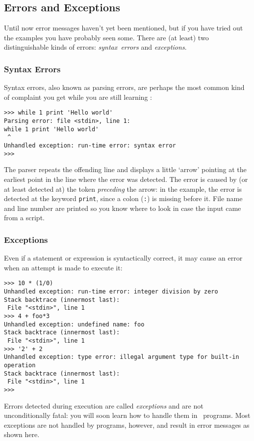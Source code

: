 \subsection{Errors and Exceptions}

Until now error messages haven't yet been mentioned, but if you have
tried out the examples you have probably seen some.
There are (at least) two distinguishable kinds of errors:
{\em syntax\ errors}
and
{\em exceptions}.

\subsubsection{Syntax Errors}

Syntax errors, also known as parsing errors, are perhaps the most common
kind of complaint you get while you are still learning \Python:
\bcode\begin{verbatim}
>>> while 1 print 'Hello world'
Parsing error: file <stdin>, line 1:
while 1 print 'Hello world'
 ^
Unhandled exception: run-time error: syntax error
>>>
\end{verbatim}\ecode
The parser repeats the offending line and displays a little `arrow'
pointing at the earliest point in the line where the error was detected.
The error is caused by (or at least detected at) the token
{\em preceding}
the arrow: in the example, the error is detected at the keyword
{\tt print}, since a colon ({\tt :}) is missing before it.
File name and line number are printed so you know where to look in case
the input came from a script.

\subsubsection{Exceptions}

Even if a statement or expression is syntactically correct, it may cause
an error when an attempt is made to execute it:
\bcode\small\begin{verbatim}
>>> 10 * (1/0)
Unhandled exception: run-time error: integer division by zero
Stack backtrace (innermost last):
 File "<stdin>", line 1
>>> 4 + foo*3
Unhandled exception: undefined name: foo
Stack backtrace (innermost last):
 File "<stdin>", line 1
>>> '2' + 2
Unhandled exception: type error: illegal argument type for built-in operation
Stack backtrace (innermost last):
 File "<stdin>", line 1
>>>
\end{verbatim}\ecode
Errors detected during execution are called
{\em exceptions}
and are not unconditionally fatal: you will soon learn how to handle
them in \Python\ programs.
Most exceptions are not handled by programs, however, and result
in error messages as shown here.

